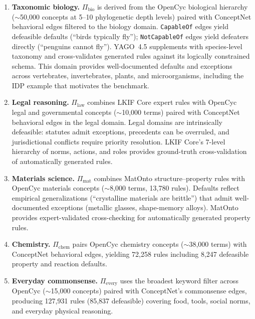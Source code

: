\documentclass{article}
\theoremstyle{definition}
\begin{document}
\begin{enumerate}[label=(\roman*),nosep]
    \item \textbf{Taxonomic biology.} $\Pi_{\mathrm{bio}}$ is derived from the OpenCyc biological hierarchy ($\sim$50,000 concepts at 5--10 phylogenetic depth levels) paired with ConceptNet behavioral edges filtered to the biology domain. \texttt{CapableOf} edges yield defeasible defaults (``birds typically fly''); \texttt{NotCapableOf} edges yield defeaters directly (``penguins cannot fly''). YAGO~4.5 supplements with species-level taxonomy and cross-validates generated rules against its logically constrained schema. This domain provides well-documented defaults and exceptions across vertebrates, invertebrates, plants, and microorganisms, including the IDP example that motivates the benchmark.

    \item \textbf{Legal reasoning.} $\Pi_{\mathrm{law}}$ combines LKIF Core expert rules with OpenCyc legal and governmental concepts ($\sim$10,000 terms) paired with ConceptNet behavioral edges in the legal domain. Legal domains are intrinsically defeasible: statutes admit exceptions, precedents can be overruled, and jurisdictional conflicts require priority resolution. LKIF Core's 7-level hierarchy of norms, actions, and roles provides ground-truth cross-validation of automatically generated rules.

    \item \textbf{Materials science.} $\Pi_{\mathrm{mat}}$ combines MatOnto structure--property rules with OpenCyc materials concepts ($\sim$8,000 terms, 13,780 rules). Defaults reflect empirical generalizations (``crystalline materials are brittle'') that admit well-documented exceptions (metallic glasses, shape-memory alloys). MatOnto provides expert-validated cross-checking for automatically generated property rules.

    \item \textbf{Chemistry.} $\Pi_{\mathrm{chem}}$ pairs OpenCyc chemistry concepts ($\sim$38,000 terms) with ConceptNet behavioral edges, yielding 72,258 rules including 8,247 defeasible property and reaction defaults.

    \item \textbf{Everyday commonsense.} $\Pi_{\mathrm{every}}$ uses the broadest keyword filter across OpenCyc ($\sim$15,000 concepts) paired with ConceptNet's commonsense edges, producing 127,931 rules (85,837 defeasible) covering food, tools, social norms, and everyday physical reasoning.
\end{enumerate}
\end{document}
